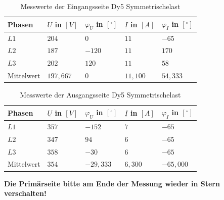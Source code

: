 \begin{enumerate}[label=\alph*)]
        \begin{table}[h!]
          \caption{Messwerte der Eingangsseite Dy5 Symmetrischelast}
          \centering
          \begin{tabular}{lllll}
            \\ \hline
            Phasen     & $\underline{U}$ in $[V]$ & $\varphi_{U}$ in $[^\circ]$ & $\underline{I}$ in $[A]$ & $\varphi_{I}$ in $[^\circ]$ \\ \hline
            $L1$       & $204$                    & $0$                         & $11$                     & $-65$                       \\
            $L2$       & $187$                    & $-120$                      & $11$                     & $170$                       \\
            $L3$       & $202$                    & $120$                       & $11$                     & $58$                        \\ \hline
            Mittelwert & $197,667$                & $0$                         & $11,100$                 & $54,333$                    \\ \hline\hline
          \end{tabular}
        \end{table}
        \begin{table}[h!]
          \centering
          \caption{Messwerte der Ausgangsseite Dy5 Symmetrischelast}
          \begin{tabular}{lllll}
            \\ \hline
            Phasen     & $\underline{U}$ in $[V]$ & $\varphi_{U}$ in $[^\circ]$ & $\underline{I}$ in $[A]$ & $\varphi_{I}$ in $[^\circ]$ \\ \hline
            $L1$       & $357$                    & $-152$                      & $7$                      & $-65$                       \\
            $L2$       & $347$                    & $94$                        & $6$                      & $-65$                       \\
            $L3$       & $358$                    & $-30$                       & $6$                      & $-65$                       \\ \hline
            Mittelwert & $354$                    & $-29,333$                   & $6,300$                  & $-65,000$                   \\ \hline\hline
          \end{tabular}
        \end{table}
\end{enumerate}
\textbf{Die Primärseite bitte am Ende der Messung wieder in Stern verschalten! }
